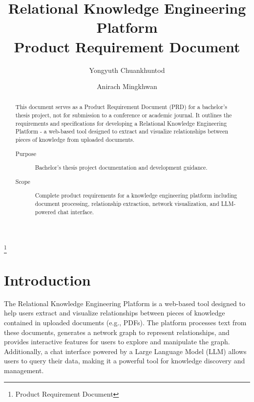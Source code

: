 \documentclass[%
 reprint,
 amsmath,amssymb,
 aps,
]{revtex4-2}
\begin{document}

\title{Relational Knowledge Engineering Platform \\ Product Requirement Document}
\thanks{Product Requirement Document}

\author{Yongyuth Chuankhuntod}
\author{Anirach Mingkhwan}

\begin{abstract}
This document serves as a Product Requirement Document (PRD) for a bachelor's thesis project, not for submission to a conference or academic journal. It outlines the requirements and specifications for developing a Relational Knowledge Engineering Platform - a web-based tool designed to extract and visualize relationships between pieces of knowledge from uploaded documents.

\begin{description}
\item[Purpose]
Bachelor's thesis project documentation and development guidance.
\item[Scope]
Complete product requirements for a knowledge engineering platform including document processing, relationship extraction, network visualization, and LLM-powered chat interface.
\end{description}
\end{abstract}

\maketitle

\section{\label{sec:introduction}Introduction}

The Relational Knowledge Engineering Platform is a web-based tool designed to help users extract and visualize relationships between pieces of knowledge contained in uploaded documents (e.g., PDFs). The platform processes text from these documents, generates a network graph to represent relationships, and provides interactive features for users to explore and manipulate the graph. Additionally, a chat interface powered by a Large Language Model (LLM) allows users to query their data, making it a powerful tool for knowledge discovery and management.
\end{document}
